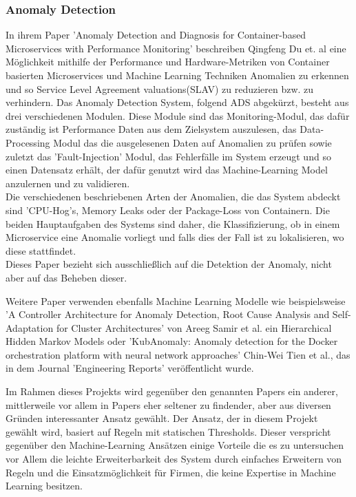 \documentclass[a4paper,12pt]{scrartcl}
\begin{document}
\subsubsection{Anomaly Detection}
In ihrem Paper 'Anomaly Detection and Diagnosis for Container-based Microservices with Performance Monitoring' beschreiben Qingfeng Du et. al eine Möglichkeit mithilfe der Performance und Hardware-Metriken von Container basierten Microservices und Machine Learning Techniken  Anomalien zu erkennen und so Service Level Agreement valuations(SLAV) zu reduzieren bzw. zu verhindern. Das Anomaly Detection System, folgend ADS abgekürzt, besteht aus drei verschiedenen Modulen. Diese Module sind das Monitoring-Modul, das dafür zuständig ist Performance Daten aus dem Zielsystem auszulesen, das Data-Processing Modul das die ausgelesenen Daten auf Anomalien zu prüfen sowie zuletzt das 'Fault-Injection' Modul, das Fehlerfälle im System erzeugt und so einen Datensatz erhält, der dafür genutzt wird das Machine-Learning Model anzulernen und zu validieren.\\
Die verschiedenen beschriebenen Arten der Anomalien, die das System abdeckt sind 'CPU-Hog's, Memory Leaks oder der Package-Loss von Containern. Die beiden Hauptaufgaben des Systems sind daher, die Klassifizierung, ob in einem Microservice eine Anomalie vorliegt und falls dies der Fall ist zu lokalisieren, wo diese stattfindet.\\
Dieses Paper bezieht sich ausschließlich auf die Detektion der Anomaly, nicht aber auf das Beheben dieser.

Weitere Paper verwenden ebenfalls Machine Learning Modelle wie beispielsweise 'A Controller Architecture for Anomaly Detection, Root Cause Analysis and Self-Adaptation for Cluster Architectures' von Areeg Samir et al. ein  Hierarchical Hidden Markov Models oder 'KubAnomaly: Anomaly detection for the Docker orchestration platform with neural network approaches' Chin‐Wei Tien et al., das in dem Journal 'Engineering Reports' veröffentlicht wurde.

Im Rahmen dieses Projekts wird gegenüber den genannten Papers ein anderer, mittlerweile vor allem in Papers eher seltener zu findender, aber aus diversen Gründen interessanter Ansatz gewählt. Der Ansatz, der in diesem Projekt gewählt wird, basiert auf Regeln mit statischen Thresholds. Dieser verspricht gegenüber den Machine-Learning Ansätzen einige Vorteile die es zu untersuchen vor Allem die leichte Erweiterbarkeit des System durch einfaches Erweitern von Regeln und die Einsatzmöglichkeit für Firmen, die keine Expertise in Machine Learning besitzen.
\end{document}
